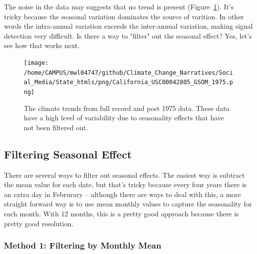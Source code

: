 \documentclass{article}
\begin{document}
The noise in the data may suggests that no trend is present (Figure~\ref{fig:GSOM-1975trend}). It's tricky because the seasonal variation dominates the source of varition. In other words the intra-annual variation exceeds the inter-annual variation, making signal detection very difficult. Is there a way to "filter" out the seasonal effect? Yes, let's see how that works next. 

\begin{figure}
\texttt{[image: /home/CAMPUS/mwl04747/github/Climate\_Change\_Narratives/Social\_Media/State\_htmls/png/California\_USC00042805\_GSOM\_1975.png]}
\caption{The climate trends from full record and post 1975 data. These data have a high level of variability due to seasonality effects that have not been filtered out.}
\label{fig:GSOM-1975trend}
\end{figure}


\subsection{Filtering Seasonal Effect}

There are several ways to filter out seasonal effects. The easiest way is subtract the mean value for each date, but that's tricky because every four years there is an extra day in Februrary -- although there are ways to deal with this, a more straight forward way is to use mean monthly values to capture the seasonality for each month. With 12 months, this is a pretty good approach because there is pretty good resolution. 

\subsubsection{Method 1: Filtering by Monthly Mean} 
\end{document}
